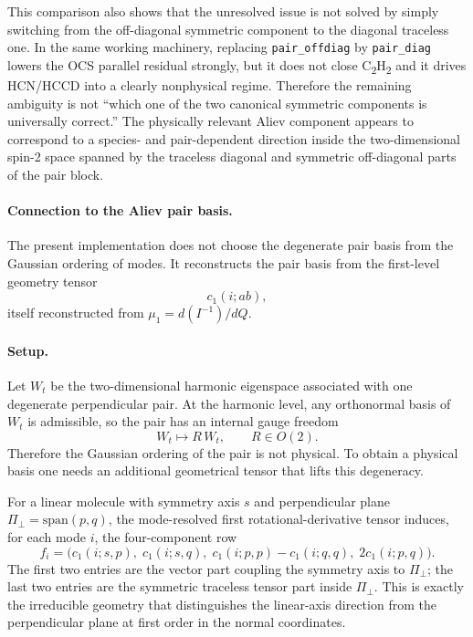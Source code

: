\documentclass[11pt]{article}
\begin{document}
This comparison also shows that the unresolved issue is not solved by simply
switching from the off-diagonal symmetric component to the diagonal traceless
one. In the same working machinery, replacing \texttt{pair\_offdiag} by
\texttt{pair\_diag} lowers the OCS parallel residual strongly, but it does not
close \texorpdfstring{C\textsubscript{2}H\textsubscript{2}}{C2H2} and it drives
HCN/HCCD into a clearly nonphysical regime. Therefore the remaining ambiguity
is not ``which one of the two canonical symmetric components is universally
correct.'' The physically relevant Aliev component appears to correspond to a
species- and pair-dependent direction inside the two-dimensional spin-2 space
spanned by the traceless diagonal and symmetric off-diagonal parts of the pair
block.

\paragraph{Connection to the Aliev pair basis.}
The present implementation does not choose the degenerate pair basis from the
Gaussian ordering of modes. It reconstructs the pair basis from the first-level
geometry tensor
\[
c_1(i;ab),
\]
itself reconstructed from $\mu_1=d(I^{-1})/dQ$.

\paragraph{Setup.}
Let $W_t$ be the two-dimensional harmonic eigenspace associated with one
degenerate perpendicular pair. At the harmonic level, any orthonormal basis of
$W_t$ is admissible, so the pair has an internal gauge freedom
\[
W_t \mapsto R\,W_t,
\qquad
R\in O(2).
\]
Therefore the Gaussian ordering of the pair is not physical. To obtain a
physical basis one needs an additional geometrical tensor that lifts this
degeneracy.

For a linear molecule with symmetry axis $s$ and perpendicular plane
$\Pi_\perp=\mathrm{span}(p,q)$, the mode-resolved first rotational-derivative
tensor induces, for each mode $i$, the four-component row
\[
f_i =
\bigl(
c_1(i;s,p),\;
c_1(i;s,q),\;
c_1(i;p,p)-c_1(i;q,q),\;
2c_1(i;p,q)
\bigr).
\]
The first two entries are the vector part coupling the symmetry axis to
$\Pi_\perp$; the last two entries are the symmetric traceless tensor part
inside $\Pi_\perp$. This is exactly the irreducible geometry that distinguishes
the linear-axis direction from the perpendicular plane at first order in the
normal coordinates.
\end{document}
